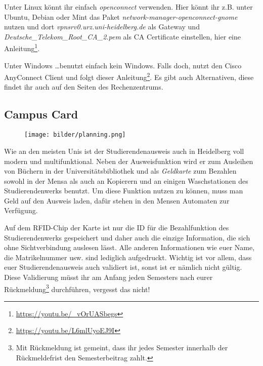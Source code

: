 Unter Linux könnt ihr einfach \emph{openconnect} verwenden. Hier könnt ihr z.B. unter Ubuntu, Debian oder Mint das Paket \emph{network-manager-openconnect-gnome} nutzen und dort \emph{vpnsrv0.urz.uni-heidelberg.de} als Gateway und \emph{Deutsche\_Telekom\_Root\_CA\_2.pem} als CA Certificate einstellen, hier eine Anleitung\footnote{\url{https://youtu.be/_vOrUASbegs}}.

Unter Windows \ldots benutzt einfach kein Windows. Falls doch, nutzt den Cisco AnyConnect Client und folgt dieser Anleitung\footnote{\url{https://youtu.be/L6mlUyoEJ9I}}. Es gibt auch Alternativen, diese findet ihr auch auf den Seiten des Rechenzentrums.

\subsection{Campus Card}
\label{campuscard}

\begin{figure}[b]
    \centering
    \texttt{[image: bilder/planning.png]}
\end{figure}

Wie an den meisten Unis ist der Studierendenausweis auch in Heidelberg voll modern und multifunktional. Neben der Ausweisfunktion wird er zum Ausleihen von Büchern in der Universitätsbibliothek und als \emph{Geldkarte} zum Bezahlen sowohl in der Mensa als auch an Kopierern und an einigen Waschstationen des Studierendenwerks benutzt. Um diese Funktion nutzen zu können, muss man Geld auf den Ausweis laden, dafür stehen in den Mensen Automaten zur Verfügung.

Auf dem RFID-Chip der Karte ist nur die ID für die Bezahlfunktion des Studierendenwerks gespeichert und daher auch die einzige Information, die sich ohne Sichtverbindung auslesen lässt. 
Alle anderen Informationen wie euer Name, die Matrikelnummer usw. sind lediglich aufgedruckt. Wichtig ist vor allem, dass euer Studierendenausweis auch validiert ist, sonst ist er nämlich nicht gültig. Diese Validierung müsst ihr am Anfang jeden Semesters nach eurer Rückmeldung\footnote{Mit Rückmeldung ist gemeint, dass ihr jedes Semester innerhalb der Rückmeldefrist den Semesterbeitrag zahlt.} durchführen, vergesst das nicht!

